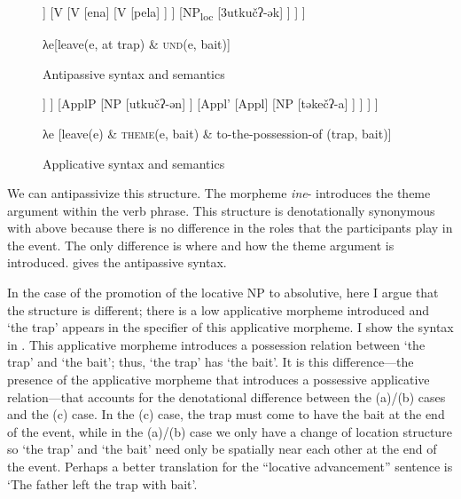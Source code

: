 \documentclass[output=paper,colorlinks,citecolor=brown,modfonts,nonflat]{langsci/langscibook}
\begin{document}
\begin{figure}[p]
\small
	\begin{forest}
	[VP
		[NP
			[təkečʔ-a3]
		]
		[V
			[V
				[ena]
				[V
					[pela]
				]
			]
			[NP\textsubscript{loc}
				[3utkučʔ-ək]
			]
		]
	]
	\end{forest}

	λe[leave(e, at trap) \& \textsc{und}(e, bait)]

	\caption{\label{fig:basilico:11}Antipassive syntax and semantics}
\end{figure}

\begin{figure}[p]
\small
	\begin{forest}
		[VP
			[V
				[ena]
				[V
					[pela]
				]
			]
			[ApplP
				[NP
					[utkučʔ-ən]
				]
				[Appl'
					[Appl]
					[NP
						[təkečʔ-a]
					]
				]
			]
		]
	\end{forest}

	λe [leave(e) \& \textsc{{theme}}(e, bait) \& to-the-possession-of (trap, bait)]
\caption{\label{fig:basilico:12}Applicative syntax and semantics}
\end{figure}



We can antipassivize this structure. The morpheme \textit{ine}{}- introduces the theme argument within the verb phrase. This structure is denotationally synonymous with  above because there is no difference in the roles that the participants play in the event. The only difference is where and how the theme argument is introduced.  gives the antipassive syntax.


In the case of the promotion of the locative NP to absolutive, here I argue that the structure is different; there is a low applicative morpheme introduced and ‘the trap’ appears in the specifier of this applicative morpheme. I show the syntax in . This applicative morpheme introduces a possession relation between ‘the trap’ and ‘the bait’; thus, ‘the trap’ has ‘the bait’. It is this difference—the presence of the applicative morpheme that introduces a possessive applicative relation—that accounts for the denotational difference between the (a)/(b) cases and the (c) case. In the (c) case, the trap must come to have the bait at the end of the event, while in the (a)/(b) case we only have a change of location structure so ‘the trap’ and ‘the bait’ need only be spatially near each other at the end of the event. Perhaps a better translation for the ``locative advancement'' sentence is ‘The father left the trap with bait’.
\end{document}
